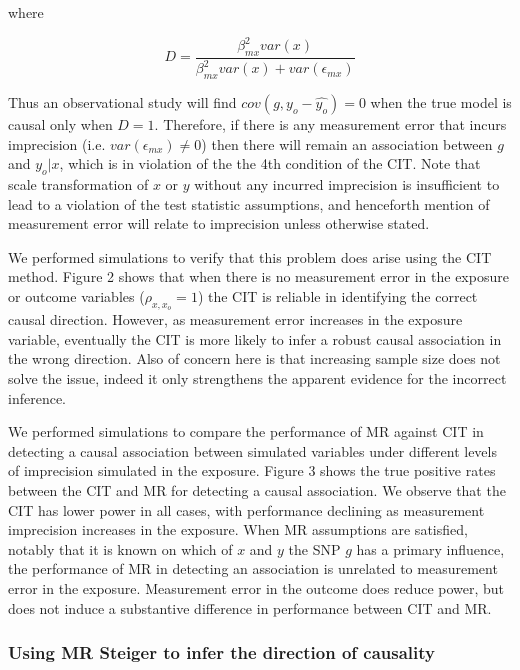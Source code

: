 \documentclass[]{article}
\begin{document}
where

\[
D = \frac{\beta^2_{mx} var(x)} {\beta^2_{mx} var(x) + var(\epsilon_{mx})}
\]

Thus an observational study will find \(cov(g, y_o - \hat{y_o}) = 0\)
when the true model is causal only when \(D = 1\). Therefore, if there
is any measurement error that incurs imprecision (i.e.
\(var(\epsilon_{mx}) \neq 0\)) then there will remain an association
between \(g\) and \(y_o | x\), which is in violation of the the 4th
condition of the CIT. Note that scale transformation of \(x\) or \(y\)
without any incurred imprecision is insufficient to lead to a violation
of the test statistic assumptions, and henceforth mention of measurement
error will relate to imprecision unless otherwise stated.

We performed simulations to verify that this problem does arise using
the CIT method. Figure 2 shows that when there is no measurement error
in the exposure or outcome variables (\(\rho_{x, x_o}=1\)) the CIT is
reliable in identifying the correct causal direction. However, as
measurement error increases in the exposure variable, eventually the CIT
is more likely to infer a robust causal association in the wrong
direction. Also of concern here is that increasing sample size does not
solve the issue, indeed it only strengthens the apparent evidence for
the incorrect inference.

We performed simulations to compare the performance of MR against CIT in
detecting a causal association between simulated variables under
different levels of imprecision simulated in the exposure. Figure 3
shows the true positive rates between the CIT and MR for detecting a
causal association. We observe that the CIT has lower power in all
cases, with performance declining as measurement imprecision increases
in the exposure. When MR assumptions are satisfied, notably that it is
known on which of \(x\) and \(y\) the SNP \(g\) has a primary influence,
the performance of MR in detecting an association is unrelated to
measurement error in the exposure. Measurement error in the outcome does
reduce power, but does not induce a substantive difference in
performance between CIT and MR.

\subsubsection{Using MR Steiger to infer the direction of
causality}\label{using-mr-steiger-to-infer-the-direction-of-causality}
\end{document}
